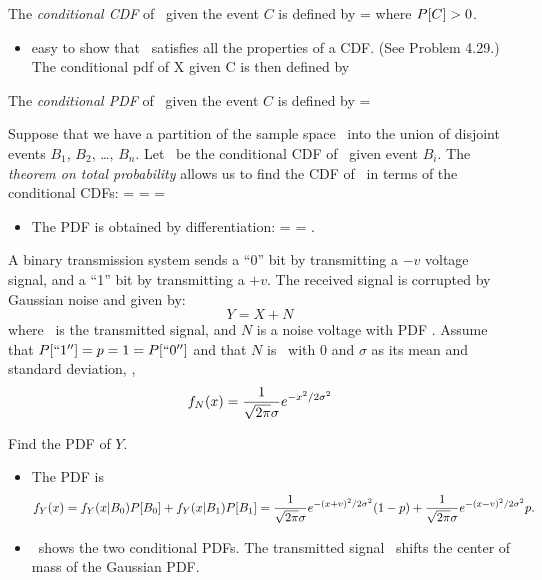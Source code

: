\bit
	\item The \emph{conditional CDF} of \X\ given the event $C$ is defined by
		 = 
	\eeql
	where $P[C] > 0$.

	\begin{itemize}
		\item easy to show that \ satisfies
		all the properties of a CDF.
		(See Problem 4.29.) The conditional pdf of X given C is then defined by
	\end{itemize}


	\item The \emph{conditional PDF} of \X\ given the event $C$ is defined by
		 = 
		 
	\eeql

	\item Suppose that we have a partition of the sample space \sspace\
	into the union of disjoint events $B_1$, $B_2$, \ldots, $B_n$.
	Let \ be the conditional CDF of \X\ given event $B_i$.
	The \emph{theorem on total probability}
	allows us to find the CDF of \X\ in terms of the conditional CDFs:
	\beql{eq-theorem-total-prob-cdf}
		= 
		= \sumiton {} 
		= \sumiton {} 
	\eeql

	\begin{itemize}
		\item The PDF is obtained by differentiation:
			 =  \ddx {}
			= \sumiton {} .
		\eeql
	\end{itemize}


	\item {}
	A binary transmission system sends a ``0'' bit by transmitting
	a $-v$ voltage signal,
	and a ``1'' bit by transmitting a $+v$.
	The received signal is corrupted by Gaussian noise and given by:
	\[
		Y = X + N
	\]
	where \X\ is the transmitted signal,
	and $N$ is a noise voltage with PDF .
	Assume that $P[``1''] = p = 1 = P[``0'']$
	and that $N$ is \gaussrv\ with $0$ and $\sigma$ as its mean and standard deviation,
	\ie,
	\[
		f_{N}(x) =
		{\frac{1}{\sqrt{2\pi} {\sigma}} e^{-x^2/2{\sigma}^2} }
	\]

	Find the PDF of $Y$.

	\begin{itemize}
		\item The PDF is
		\[
			f_{Y}(x)
			= f_{Y}(x|B_0) P[B_0]
			+ f_{Y}(x|B_1) P[B_1]
			=
			\frac{1}{\sqrt{2\pi} {\sigma}} e^{-({x}{+v})^2/2{\sigma}^2} (1-p)
			+ \frac{1}{\sqrt{2\pi} {\sigma}} e^{-({x}{-v})^2/2{\sigma}^2} p.
		\]

		\item 
		\ shows the two conditional PDFs.
		The transmitted signal \X\ shifts the center of mass of the Gaussian PDF.
	\end{itemize}

